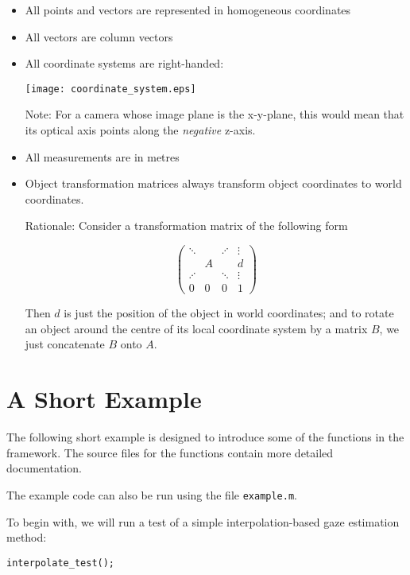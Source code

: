 \documentclass{scrartcl}
\begin{document}
\begin{itemize}
\item All points and vectors are represented in homogeneous coordinates

\item All vectors are column vectors

\item All coordinate systems are right-handed:

\vspace{1em}
\texttt{[image: coordinate\_system.eps]}
\vspace{1em}

  Note: For a camera whose image plane is the x-y-plane, this would mean that
  its optical axis points along the \emph{negative} z-axis.

\item All measurements are in metres

\item Object transformation matrices always transform object coordinates to 
  world coordinates.

  Rationale: Consider a transformation matrix of the following form

\[
\left(
\begin{array}{cccc}
\ddots &   &  \iddots & \vdots \\
  & A &   & d \\
\iddots  &   & \ddots & \vdots \\
0 & 0 & 0 & 1
\end{array}
\right)
\]

  Then $d$ is just the position of the object in world coordinates; and to
  rotate an object around the centre of its local coordinate system by a
  matrix $B$, we just concatenate $B$ onto $A$.
\end{itemize}

\section{A Short Example}

The following short example is designed to introduce some of the functions in
the framework. The source files for the functions contain more detailed
documentation.

The example code can also be run using the file \texttt{example.m}.

To begin with, we will run a test of a simple interpolation-based gaze
estimation method:

\begin{verbatim}
interpolate_test();
\end{verbatim}
\end{document}
